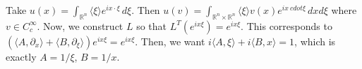 \documentclass[12pt]{scrartcl}
\newcommand{\R}{\mathbb{R}}
\newcommand{\<}{\langle}
\renewcommand{\>}{\rangle}
\begin{document}
\begin{example} Take $u(x) = \int_{\R^n} \<\xi\>e^{ix \cdot \xi}\,d\xi$.  Then $u(v) = \int_{\R^n \times \R^n} \<\xi\>v(x) e^{ix\ cdot \xi} \,dx d\xi$ where $v \in C_c^\infty$.  Now, we construct $L$ so that $L^T(e^{ix\xi}) = e^{ix\xi}$.  This corresponds to $(\<A, \partial_x\> + \<B, \partial_\xi\>)e^{ix\xi} = e^{ix\xi}$.  Then, we want $i\<A, \xi\> + i\<B, x\> = 1$, which is exactly $A = 1/\xi$, $B = 1/x$.  
\end{example}
\end{document}
